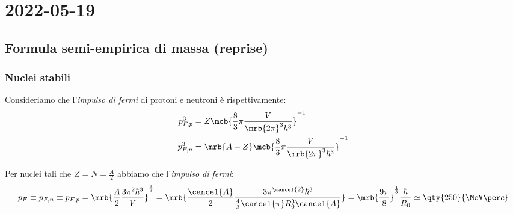 \chapter{2022-05-19}
\section{Formula semi-empirica di massa (reprise)}
\subsection{Nuclei stabili}
Consideriamo che l'\textit{impulso di fermi} di protoni e neutroni è
rispettivamente:
\begin{align}
  p _{F,p}^{3} &= Z \mcb{\frac{8}{3} \pi \frac{V}{\mrb{2 \pi}^{3}
  \hbar^3}}^{-1}
  \\
  p _{F,n}^{3} &= \mrb{A - Z} \mcb{\frac{8}{3} \pi \frac{V}{\mrb{2 \pi}^{3}
  \hbar^3}}^{-1}
\end{align}
\begin{note}[]
  Per nuclei tali che $Z = N = \frac{A}{2}$ abbiamo che l'\textit{impulso di
  fermi}:
  \begin{equation}
    p_F
    \equiv  p _{F, n}
    \equiv  p _{F, p}
    = \mrb{\frac{A}{2} \frac{3 \pi^2 \hbar^3}{V}}^{\frac{1}{3}}
    = \mrb{\frac{\cancel{A}}{2} \frac{3 \pi^{\cancel{2}} \hbar^3}{\frac{4}{3}
      \cancel{\pi} R_0^3 \cancel{A}}}
    = \mrb{\frac{9 \pi}{8}}^{\frac{1}{3}} \frac{\hbar}{R_0}
    \simeq \qty{250}{\MeV \per c}
  \end{equation}
\end{note}

